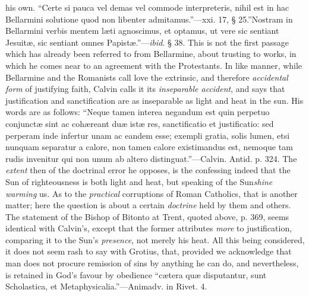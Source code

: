 his own. ``Certe si pauca vel demas vel commode interpreteris,
nihil est in hac Bellarmini solutione quod non libenter admitamus.''—xxi.
17, § 25.''Nostram in Bellarmini verbis mentem læti agnoscimus,
et optamus, ut vere sic sentiant Jesuitæ, sic sentiant omnes Papistæ.''—\emph{ibid}.
§ 38. This is not the first passage which has already been referred
to from Bellarmine, about trusting to works, in which he comes near to
an agreement with the Protestants. In like manner, while Bellarmine
and the Romanists call love the extrinsic, and therefore \emph{accidental
form} of justifying faith, Calvin calls it its \emph{inseparable
accident}, and says that justification and sanctification are as
inseparable as light and heat in the sun. His words are as follows:
``Neque tamen interea negandum est quin perpetuo conjunctæ sint
ac cohæreant duæ istæ res, sanctificatio et justificatio: sed
perperam inde infertur unam ac eandem esse; exempli gratia, solis
lumen, etsi nunquam separatur a calore, non tamen calore existimandus
est, nemoque tam rudis invenitur qui non unum ab altero distinguat.''—Calvin.
Antid. p. 324. The \emph{extent} then of the doctrinal error he
opposes, is the confessing indeed that the Sun of righteousness is
both light and heat, but speaking of the Sun\emph{shine} \emph{warming}
us. As to the \emph{practical} corruptions of Roman Catholics, that is
another matter; here the question is about a certain \emph{doctrine}
held by them and others. The statement of the Bishop of Bitonto at
Trent, quoted above, p. 369, seems identical with Calvin's,
except that the former attributes \emph{more} to justification,
comparing it to the Sun's \emph{presence}, not merely his heat. All
this being considered, it does not seem rash to say with Grotius,
that, provided we acknowledge that man does not procure remission of
sins by anything he can do, and nevertheless, is retained in God's
favour by obedience ``cætera quæ disputantur, sunt Scholastica,
et Metaphysicalia.''—Animadv. in Rivet. 4.

